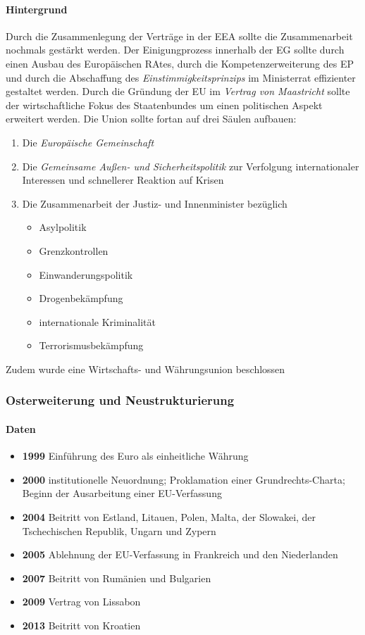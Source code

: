 \documentclass{article}
\begin{document}
	\paragraph{Hintergrund}
	Durch die Zusammenlegung der Verträge in der EEA sollte die Zusammenarbeit nochmals gestärkt werden. Der Einigungprozess innerhalb der EG sollte durch einen Ausbau des Europäischen RAtes, durch die Kompetenzerweiterung des EP und durch die Abschaffung des \textit{Einstimmigkeitsprinzips} im Ministerrat effizienter gestaltet werden.
	Durch die Gründung der EU im \textit{Vertrag von Maastricht} sollte der wirtschaftliche Fokus des Staatenbundes um einen politischen Aspekt erweitert werden. Die Union sollte fortan auf drei Säulen aufbauen:

	\begin{enumerate}
		\item Die \textit{Europäische Gemeinschaft}
		\item Die \textit{Gemeinsame Außen- und Sicherheitspolitik} zur Verfolgung internationaler Interessen und schnellerer Reaktion auf Krisen
		\item Die Zusammenarbeit der Justiz- und Innenminister bezüglich 
		\begin{itemize}
			\item Asylpolitik
			\item Grenzkontrollen
			\item Einwanderungspolitik
			\item Drogenbekämpfung
			\item internationale Kriminalität
			\item Terrorismusbekämpfung
		\end{itemize}
	\end{enumerate}

	Zudem wurde eine Wirtschafts- und Währungsunion beschlossen

	\subsubsection{Osterweiterung und Neustrukturierung}
	\paragraph{Daten}
	\begin{itemize}
		\item \textbf{1999} Einführung des Euro als einheitliche Währung
		\item \textbf{2000} institutionelle Neuordnung; Proklamation einer Grundrechts-Charta; Beginn der Ausarbeitung einer EU-Verfassung
		\item \textbf{2004} Beitritt von Estland, Litauen, Polen, Malta, der Slowakei, der Tschechischen Republik, Ungarn und Zypern
		\item \textbf{2005} Ablehnung der EU-Verfassung in Frankreich und den Niederlanden
		\item \textbf{2007} Beitritt von Rumänien und Bulgarien
		\item \textbf{2009} Vertrag von Lissabon
		\item \textbf{2013} Beitritt von Kroatien
	\end{itemize}
\end{document}

